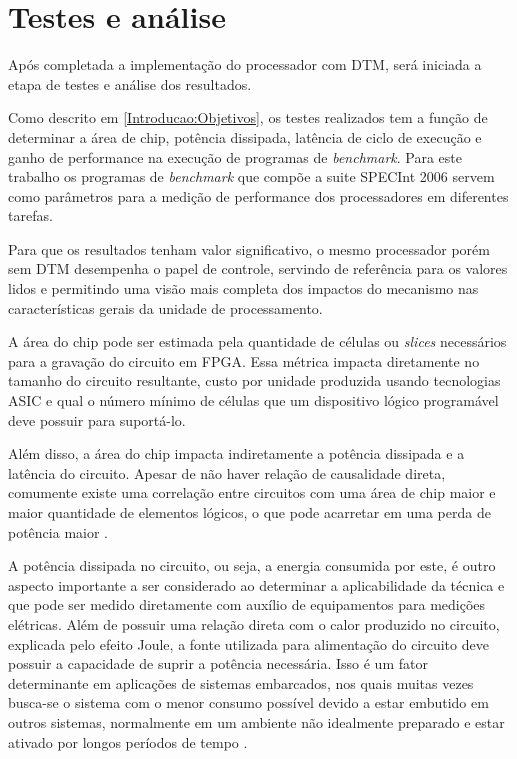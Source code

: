 \section{Testes e análise}
\label{Metodologia:Analise}

Após completada a implementação do processador com DTM, será iniciada a etapa de testes e análise dos resultados. 


Como descrito em \ref{Introducao:Objetivos}, os testes realizados tem a função de determinar a área de chip, potência dissipada, latência de ciclo de execução e ganho de performance na execução de programas de \textit{benchmark}. Para este trabalho os programas de \textit{benchmark} que compõe a suite SPECInt 2006 servem como parâmetros para a medição de performance dos processadores em diferentes tarefas.

Para que os resultados tenham valor significativo, o mesmo processador porém sem DTM desempenha o papel de controle, servindo de referência para os valores lidos e permitindo uma visão mais completa dos impactos do mecanismo nas características gerais da unidade de processamento.

A área do chip pode ser estimada pela quantidade de células ou \textit{slices} necessários para a gravação do circuito em FPGA. Essa métrica impacta diretamente no tamanho do circuito resultante, custo por unidade produzida usando tecnologias ASIC e qual o número mínimo de células que um dispositivo lógico programável deve possuir para suportá-lo.

Além disso, a área do chip impacta indiretamente a potência dissipada e a latência do circuito. Apesar de não haver relação de causalidade direta, comumente existe uma correlação entre circuitos com uma área de chip maior e maior quantidade de elementos lógicos, o que pode acarretar em uma perda de potência maior \cite{chu2006rtl}.

A potência dissipada no circuito, ou seja, a energia consumida por este, é outro aspecto importante a ser considerado ao determinar a aplicabilidade da técnica e que pode ser medido diretamente com auxílio de equipamentos para medições elétricas. Além de possuir uma relação direta com o calor produzido no circuito, explicada pelo efeito Joule, a fonte utilizada para alimentação do circuito deve possuir a capacidade de suprir a potência necessária. Isso é um fator determinante em aplicações de sistemas embarcados, nos quais muitas vezes busca-se o sistema com o menor consumo possível devido a estar embutido em outros sistemas, normalmente em um ambiente não idealmente preparado e estar ativado por longos períodos de tempo \cite{tanenbaum2009organizacao}.

